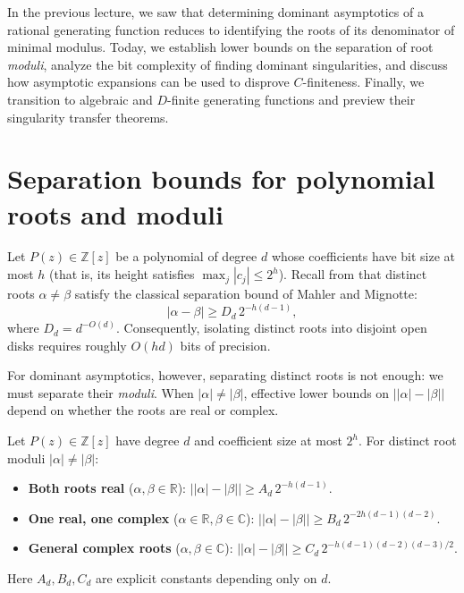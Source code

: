 
In the previous lecture, we saw that determining dominant asymptotics of a rational generating function reduces to identifying the roots of its denominator of minimal modulus.
Today, we establish lower bounds on the separation of root \emph{moduli}, analyze the bit complexity of finding dominant singularities, and discuss how asymptotic expansions can be used to disprove \(C\)-finiteness.
Finally, we transition to algebraic and \(D\)-finite generating functions and preview their singularity transfer theorems.


\section*{Separation bounds for polynomial roots and moduli}

Let \(P(z) \in \mathbb{Z}[z]\) be a polynomial of degree \(d\) whose coefficients have bit size at most \(h\) (that is, its height satisfies \(\max_j |c_j| \le 2^h\)).
Recall from  that distinct roots \(\alpha \neq \beta\) satisfy the classical separation bound of Mahler and Mignotte:
\[
    |\alpha - \beta| \ge D_d \, 2^{-h(d-1)},
\]
where \(D_d = d^{-O(d)}\).
Consequently, isolating distinct roots into disjoint open disks requires roughly \(O(hd)\) bits of precision.

For dominant asymptotics, however, separating distinct roots is not enough: we must separate their \emph{moduli}.
When \(|\alpha| \neq |\beta|\), effective lower bounds on \(\big| |\alpha| - |\beta| \big|\) depend on whether the roots are real or complex.

\begin{lemma}
    \label{lem:modulus-separation}
    Let \(P(z) \in \mathbb{Z}[z]\) have degree \(d\) and coefficient size at most \(2^h\).
    For distinct root moduli \(|\alpha| \neq |\beta|\):
    \begin{itemize}
        \item \textbf{Both roots real} (\(\alpha, \beta \in \mathbb{R}\)):
        \(\big| |\alpha| - |\beta| \big| \ge A_d \, 2^{-h(d-1)}\).
        \item \textbf{One real, one complex} (\(\alpha \in \mathbb{R}, \beta \in \mathbb{C}\)):
        \(\big| |\alpha| - |\beta| \big| \ge B_d \, 2^{-2h(d-1)(d-2)}\).
        \item \textbf{General complex roots} (\(\alpha, \beta \in \mathbb{C}\)):
        \(\big| |\alpha| - |\beta| \big| \ge C_d \, 2^{-h(d-1)(d-2)(d-3)/2}\).
    \end{itemize}
    Here \(A_d, B_d, C_d\) are explicit constants depending only on \(d\).
\end{lemma}

